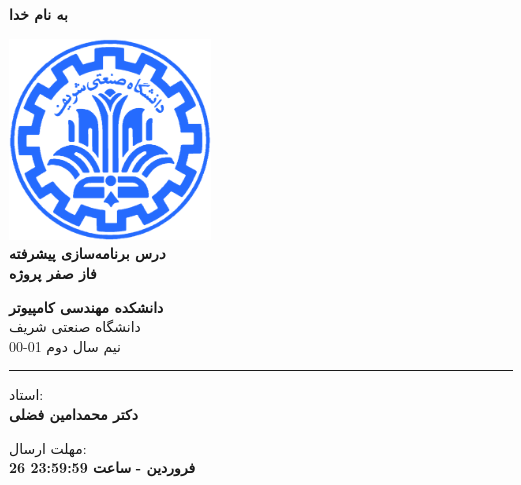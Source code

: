 \documentclass[]{article}
\begin{document}
\begin{titlepage}
\begin{center}

\textbf{ \Huge{به نام خدا} }
        
\vspace{0.2cm}

\includegraphics[width=0.4\textwidth]{sharif1.png}\\
\vspace{0.2cm}
\textbf{ \Huge{\emph درس برنامه‌سازی پیشرفته} }\\
\vspace{0.25cm}
\textbf{ \Large{ فاز صفر پروژه} }
\vspace{0.2cm}
       
 
      \large \textbf{دانشکده مهندسی کامپیوتر}\\\vspace{0.1cm}
    \large   دانشگاه صنعتی شریف\\\vspace{0.2cm}
       \large   ﻧﯿﻢ سال دوم 01-00 \\\vspace{0.10cm}
      \noindent\rule[1ex]{\linewidth}{1pt}
استاد:\\
    \textbf{{دکتر محمدامین فضلی}}



    \vspace{0.20cm}

   مهلت ارسال:\\
    \textbf{{26 فروردین - }}
    \textbf{{ساعت 23:59:59}}

    \vspace{0.10cm}



\end{center}
\end{titlepage}


\newpage
\pagestyle{fancy}
\fancyhf{}
\fancyfoot{}
\cfoot{\thepage}
\renewcommand{\headrulewidth}{2pt}
\end{document}
